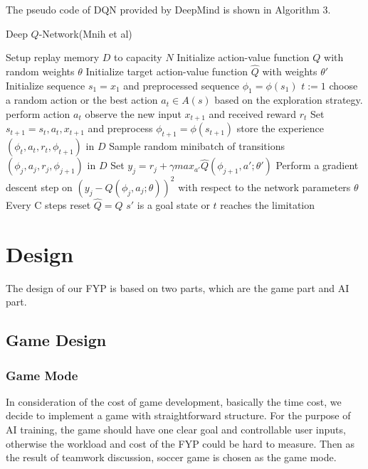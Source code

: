 \documentclass[14pt]{extarticle}
\begin{document}
The pseudo code of DQN provided by DeepMind is shown in Algorithm 3.
\begin{algorithm}
    \caption{Deep $Q$-Network(Mnih et al)}\label{euclid}
    \begin{algorithmic}[1]
    \State Setup replay memory $D$ to capacity $N$
    \State Initialize action-value function $Q$ with random weights $\theta$
    \State Initialize target action-value function $\hat{Q}$ with weights $\theta'$
        \State Initialize sequence $s_1 = {x_1}$ and preprocessed sequence $\phi_1 = \phi(s_1)$
        \State $t := 1$
        \Repeat
            \State choose a random action or the best action $a_t \in A(s)$ based on the exploration strategy.
            \State perform action $a_t$
            \State observe the new input $x_{t+1}$ and received reward $r_t$
            \State Set $s_{t+1} = s_t,a_t,x_{t+1}$ and preprocess $\phi_{t+1} = \phi(s_{t+1})$
            \State store the experience $(\phi_t, a_t, r_t, \phi_{t+1})$ in $D$
            \State Sample random minibatch of transitions $(\phi_j, a_j, r_j, \phi_{j+1})$ in $D$
            \State Set $y_j = r_j + \gamma max_{a'} \hat{Q}(\phi_{j+1},a'; \theta')$
            \State Perform a gradient descent step on $(y_j - Q(\phi_j, a_j; \theta))^2$ with respect to the network parameters $\theta$
            \State Every C steps reset $\hat{Q} = Q$ 
        \Until $s'$ is a goal state or $t$ reaches the limitation
    \EndFor
    \end{algorithmic}
\end{algorithm}

\section{Design}

The design of our FYP is based on two parts, which are the game part and AI part.

\subsection{Game Design}

\subsubsection{Game Mode}
In consideration of the cost of game development, basically the time cost, we decide to implement a game with straightforward structure. For the purpose of AI training, the game should have one clear goal and controllable user inputs, otherwise the workload and cost of the FYP could be hard to measure. Then as the result of teamwork discussion, soccer game is chosen as the game mode.
\end{document}
